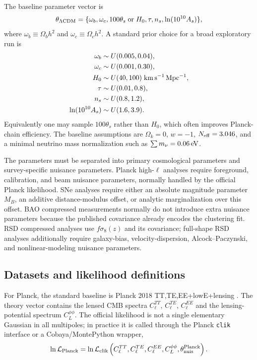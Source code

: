 \documentclass[pdflatex,sn-mathphys-num]{sn-jnl}%
\begin{document}
The baseline parameter vector is
\begin{equation}
\theta_{\Lambda{\rm CDM}}=\{\omega_b,\omega_c,100\theta_s\;{\rm or}\;H_0,\tau,n_s,\ln(10^{10}A_s)\},
\end{equation}
where $\omega_b\equiv\Omega_bh^2$ and $\omega_c\equiv\Omega_ch^2$. A standard
prior choice for a broad exploratory run is
\begin{align}
\omega_b &\sim U(0.005,0.04),\nonumber\\
\omega_c &\sim U(0.001,0.30),\nonumber\\
H_0 &\sim U(40,100)\;{\rm km\,s^{-1}\,Mpc^{-1}},\nonumber\\
\tau &\sim U(0.01,0.8),\nonumber\\
n_s &\sim U(0.8,1.2),\nonumber\\
\ln(10^{10}A_s)&\sim U(1.6,3.9).
\end{align}
Equivalently one may sample $100\theta_s$ rather than $H_0$, which often
improves Planck-chain efficiency. The baseline assumptions are
$\Omega_k=0$, $w=-1$, $N_{\rm eff}=3.046$, and a minimal neutrino mass
normalization such as $\sum m_\nu=0.06\,{\rm eV}$.

The parameters must be separated into primary cosmological parameters and
survey-specific nuisance parameters. Planck high-$\ell$ analyses require
foreground, calibration, and beam nuisance parameters, normally handled by the
official Planck likelihood. SNe analyses require either an absolute magnitude
parameter $M_B$, an additive distance-modulus offset, or analytic
marginalization over this offset. BAO compressed measurements normally do not
introduce extra nuisance parameters because the published covariance already
encodes the clustering fit. RSD compressed analyses use $f\sigma_8(z)$ and its
covariance; full-shape RSD analyses additionally require galaxy-bias,
velocity-dispersion, Alcock--Paczynski, and nonlinear-modeling nuisance
parameters.

\subsection{Datasets and likelihood definitions}
\label{subsec:pipeline_likelihoods}

For Planck, the standard baseline is Planck 2018 TT,TE,EE+lowE+lensing \cite{Aghanim:2018eyx,Planck:2019nip}. The
theory vector contains the lensed CMB spectra $C_\ell^{TT}$, $C_\ell^{TE}$,
$C_\ell^{EE}$ and the lensing-potential spectrum $C_L^{\phi\phi}$. The official
likelihood is not a single elementary Gaussian in all multipoles; in practice it
is called through the Planck \texttt{clik} interface or a Cobaya/MontePython
wrapper,
\begin{equation}
\ln {\cal L}_{\rm Planck}=\ln {\cal L}_{\rm clik}\left(C_\ell^{TT},C_\ell^{TE},C_\ell^{EE},C_L^{\phi\phi},\theta_{\rm nuis}^{\rm Planck}\right).
\end{equation}
\end{document}
